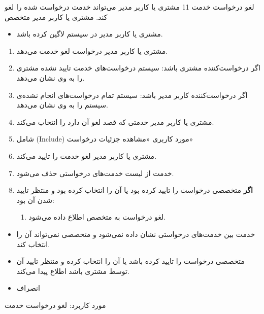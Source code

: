 {
\usecase
{
	لغو درخواست خدمت
}
{11}
{
	مشتری یا کاربر مدیر می‌تواند خدمت درخواست شده را لغو کند.
}
{
مشتری یا کاربر مدیر
}
{
	متخصص
}
{
	\begin{itemize}
		\vspace*{-0.6cm}
\item 
مشتری یا کاربر مدیر در سیستم لاگین کرده باشد.
	\end{itemize}
}
{
	\vspace*{-0.6cm}
	\begin{enumerate}
\item 
مشتری یا کاربر مدیر درخواست لغو خدمت می‌دهد.
\item اگر درخواست‌کننده مشتری باشد:
سیستم درخواست‌های خدمت تایید نشده مشتری را به وی نشان می‌دهد. 
\item اگر درخواست‌کننده کاربر مدیر باشد:
سیستم تمام درخواست‌های انجام نشده‌ی سیستم را به وی نشان می‌دهد.  
\item
مشتری یا کاربر مدیر خدمتی که قصد لغو آن دارد را انتخاب می‌کند.
\item
			شامل (Include) مورد کاربری «مشاهده جزئیات درخواست»
\item
مشتری یا کاربر مدیر لغو خدمت را تایید می‌کند.
\item
خدمت از لیست خدمت‌های درخواستی حذف می‌شود.
\item
\textbf{اگر} متخصصی درخواست را تایید کرده بود یا آن را انتخاب کرده بود و منتظر تایید شدن آن بود:
\begin{enumerate}[label=\theenumi.\arabic*.]
	\item 
لغو درخواست به متخصص اطلاع داده می‌شود.

\end{enumerate}

	\end{enumerate}
}
{
		\begin{itemize}
		\vspace*{-0.6cm}
		\item 
خدمت بین خدمت‌های درخواستی نشان داده نمی‌شود و متخصصی نمی‌تواند آن را انتخاب کند.
		\item 
متخصصی درخواست را تایید کرده باشد یا آن را انتخاب کرده و منتظر تایید آن توسط مشتری باشد اطلاع پیدا می‌کند.
	\end{itemize}

}
{
			\begin{itemize}
		\vspace*{-0.6cm}
		\item
انصراف
\end{itemize}
}
{
	مورد کاربرد: لغو درخواست خدمت
}



}





